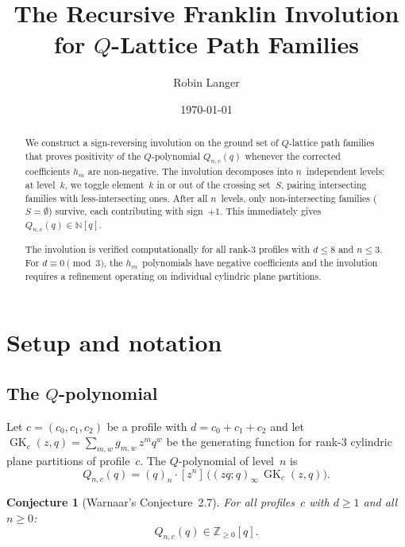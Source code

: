 \documentclass[11pt]{article}
\title{The Recursive Franklin Involution \\
  for $Q$-Lattice Path Families}
\author{Robin Langer}
\date{\today}
\newcommand{\N}{\mathbb{N}}
\newcommand{\Z}{\mathbb{Z}}
\newcommand{\GK}{\operatorname{GK}}
\newcommand{\qpoch}[2]{(#1;#2)_\infty}
\theoremstyle{plain}
\newtheorem{conjecture}[theorem]{Conjecture}
\theoremstyle{definition}
\begin{document}
\maketitle

\begin{abstract}
We construct a sign-reversing involution on the ground set
of $Q$-lattice path families that proves positivity of the
$Q$-polynomial $Q_{n,c}(q)$ whenever the corrected
coefficients $h_m$ are non-negative.  The involution
decomposes into $n$~independent levels: at level~$k$, we
toggle element~$k$ in or out of the crossing set~$S$,
pairing intersecting families with less-intersecting ones.
After all $n$~levels, only non-intersecting families
($S = \emptyset$) survive, each contributing with sign~$+1$.
This immediately gives $Q_{n,c}(q) \in \N[q]$.

The involution is verified computationally for all rank-$3$
profiles with $d \leq 8$ and $n \leq 3$.  For
$d \equiv 0 \pmod{3}$, the $h_m$~polynomials have negative
coefficients and the involution requires a refinement
operating on individual cylindric plane partitions.
\end{abstract}

\tableofcontents


\section{Setup and notation}
\label{sec:setup}


\subsection{The $Q$-polynomial}

Let $c = (c_0, c_1, c_2)$ be a profile with
$d = c_0 + c_1 + c_2$ and let
$\GK_c(z,q) = \sum_{m,w} g_{m,w}\, z^m q^w$
be the generating function for rank-$3$ cylindric plane
partitions of profile~$c$.  The $Q$-polynomial of
level~$n$ is
\begin{equation}\label{eq:Q-def}
  Q_{n,c}(q) = (q)_n \cdot [z^n]\,
    \bigl(\qpoch{zq}{q}\, \GK_c(z,q)\bigr).
\end{equation}

\begin{conjecture}[Warnaar's Conjecture~2.7]
\label{conj:warnaar}
For all profiles~$c$ with $d \geq 1$ and all $n \geq 0$:
\[
  Q_{n,c}(q) \in \Z_{\geq 0}[q].
\]
\end{conjecture}
\end{document}
